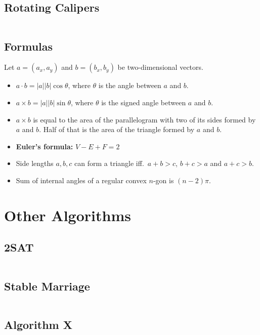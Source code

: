 \documentclass[9pt,a4paper,twocolumn,landscape,oneside]{amsart}
\newcommand{\code}[1]{\inputminted{cpp}{_code/#1}}
\newif\ifverbose
\begin{document}
    \subsection{Rotating Calipers}
        \code{geometry/rotating_calipers.cpp}

    \subsection{Formulas}
        Let $a = (a_x, a_y)$ and $b = (b_x, b_y)$ be two-dimensional vectors.
        \begin{itemize}
            \item $a\cdot b = |a||b|\cos{\theta}$, where $\theta$ is the angle
                between $a$ and $b$.
            \item $a\times b = |a||b|\sin{\theta}$, where $\theta$ is the
                signed angle between $a$ and $b$.
            \item $a\times b$ is equal to the area of the parallelogram with
                two of its sides formed by $a$ and $b$. Half of that is the
                area of the triangle formed by $a$ and $b$.
            \item \textbf{Euler's formula:} $V - E + F = 2$
            \item Side lengths $a,b,c$ can form a triangle iff.\ $a+b>c$, $b+c>a$ and $a+c>b$.
            \item Sum of internal angles of a regular convex $n$-gon is $(n-2)\pi$.
        \end{itemize}


\section{Other Algorithms}
    \subsection{2SAT}
        \ifverbose
        A fast 2SAT solver.
        \fi
        \code{other/two_sat.cpp}

    \subsection{Stable Marriage}
        \ifverbose
        The Gale-Shapley algorithm for solving the stable marriage problem.
        \fi
        \code{other/stable_marriage.cpp}

    \subsection{Algorithm X}
        \ifverbose
        An implementation of Knuth's Algorithm X, using dancing links. Solves the Exact Cover problem.
        \fi
        \code{other/algorithm_x.cpp}
\end{document}
